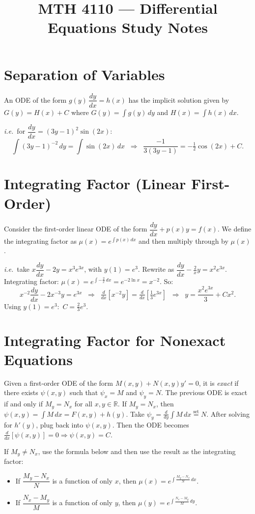 \documentclass[11pt]{article}
\title{MTH 4110 --- Differential Equations Study Notes}
\author{}
\date{}
\newcommand{\dydx}{\dfrac{dy}{dx}}
\begin{document}
\maketitle
 
\section*{Separation of Variables}
An ODE of the form $g(y)\,\dydx = h(x)$ has the implicit solution given by $G(y) = H(x) + C$ where $G(y) = \int g(y)\,dy$ and $H(x) = \int h(x)\,dx$.
 
\textit{i.e.}\ for $\dydx = (3y-1)^2 \sin(2x)$:
\[
\int (3y-1)^{-2}\,dy = \int \sin(2x)\,dx \;\;\Longrightarrow\;\; \frac{-1}{3(3y-1)} = -\tfrac{1}{2}\cos(2x) + C.
\]
 
\section*{Integrating Factor (Linear First-Order)}
Consider the first-order linear ODE of the form $\dydx + p(x)y = f(x)$. We define the integrating factor as $\mu(x) = e^{\int p(x)\,dx}$ and then multiply through by $\mu(x)$.
 
\textit{i.e.}\ take $x\dydx - 2y = x^3 e^{3x}$, with $y(1) = e^3$. Rewrite as $\dydx - \tfrac{2}{x}y = x^2 e^{3x}$. Integrating factor: $\mu(x) = e^{\int -\frac{2}{x}\,dx} = e^{-2\ln x} = x^{-2}$. So:
\[
x^{-2}\dydx - 2x^{-3}y = e^{3x} \;\;\Longrightarrow\;\; \tfrac{d}{dx}\!\left[x^{-2}y\right] = \tfrac{d}{dx}\!\left[\tfrac{1}{3}e^{3x}\right] \;\;\Longrightarrow\;\; y = \frac{x^2 e^{3x}}{3} + Cx^2.
\]
Using $y(1) = e^3$: $\,C = \tfrac{2}{3}e^3$.
 
\section*{Integrating Factor for Nonexact Equations}
Given a first-order ODE of the form $M(x,y) + N(x,y)y' = 0$, it is \emph{exact} if there exists $\psi(x,y)$ such that $\psi_x = M$ and $\psi_y = N$. The previous ODE is exact if and only if $M_y = N_x$ for all $x,y \in \mathbb{R}$. If $M_y = N_x$, then $\psi(x,y) = \int M\,dx = F(x,y) + h(y)$. Take $\psi_y = \tfrac{d}{dy}\int M\,dx \stackrel{\text{set}}{=} N$. After solving for $h'(y)$, plug back into $\psi(x,y)$. Then the ODE becomes $\tfrac{d}{dx}[\psi(x,y)] = 0 \Rightarrow \psi(x,y) = C$.
 
If $M_y \neq N_x$, use the formula below and then use the result as the integrating factor:
\begin{itemize}[leftmargin=*]
    \item If $\dfrac{M_y - N_x}{N}$ is a function of only $x$, then $\mu(x) = e^{\int \frac{M_y - N_x}{N}\,dx}$.
    \item If $\dfrac{N_x - M_y}{M}$ is a function of only $y$, then $\mu(y) = e^{\int \frac{N_x - M_y}{M}\,dy}$.
\end{itemize}
 
\end{document}
